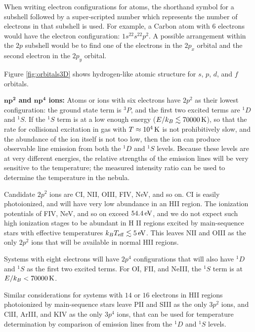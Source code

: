 \documentclass[a4paper,10pt]{article}
\begin{document}
{\noindent}When writing electron configurations for atoms, the shorthand symbol for a subshell followed by a super-scripted number which represents the number of electrons in that subshell is used. For example, a Carbon atom with $6$ electrons would have the electron configuration: $1s^22s^22p^2$. A possible arrangement within the $2p$ subshell would be to find one of the electrons in the $2p_x$ orbital and the second electron in the $2p_y$ orbital. 

{\noindent}Figure \ref{fig:orbitals3D} shows hydrogen-like atomic structure for $s$, $p$, $d$, and $f$ orbitals.

{\noindent}\textbf{$\mathbf{np^2}$ and $\mathbf{np^4}$ ions:} Atoms or ions with six electrons have $2p^2$ as their lowest configuration: the ground state term is $^3P$, and the first two excited terms are $^1D$ and $^1S$. If the $^1S$ term is at a low enough energy ($E/k_B\lesssim70000\,{\rm K}$), so that the rate for collisional excitation in gas with $T\approx10^4\,{\rm K}$ is not prohibitively slow, and the abundance of the ion itself is not too low, then the ion can produce observable line emission from both the $^1D$ and $^1S$ levels. Because these levels are at very different energies, the relative strengths of the emission lines will be very sensitive to the temperature; the measured intensity ratio can be used to determine the temperature in the nebula.

{\noindent}Candidate $2p^2$ ions are CI, NII, OIII, FIV, NeV, and so on. CI is easily photoionized, and will have very low abundance in an HII region. The ionization potentials of FIV, NeV, and so on exceed $54.4\,{\rm eV}$, and we do not expect such high ionization stages to be abundant in H II regions excited by main-sequence stars with effective temperatures $k_BT_{\rm eff}\lesssim5\,{\rm eV}$. This leaves NII and OIII as the only $2p^2$ ions that will be available in normal HII regions.

{\noindent}Systems with eight electrons will have $2p^4$ configurations that will also have $^1D$ and $^1S$ as the first two excited terms. For OI, FII, and NeIII, the $^1S$ term is at $E/k_B<70000\,{\rm K}$.

{\noindent}Similar considerations for systems with $14$ or $16$ electrons in HII regions photoionized by main-sequence stars leave PII and SIII as the only $3p^2$ ions, and ClII, ArIII, and KIV as the only $3p^4$ ions, that can be used for temperature determination by comparison of emission lines from the $^1D$ and $^1S$ levels.
\end{document}
